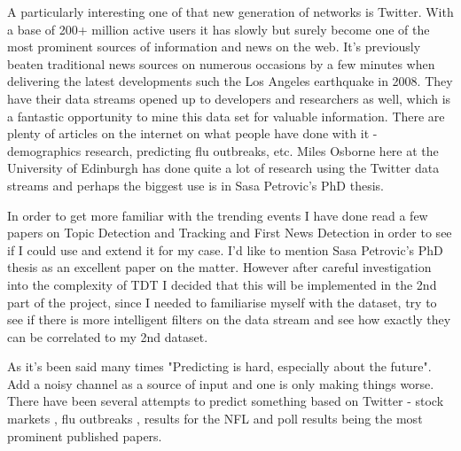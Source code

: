 \documentclass[minf,frontabs,twoside,singlespacing,parskip]{infthesis}
\begin{document}
A particularly interesting one of that new generation of networks is Twitter. With a base of 200+ million active users it has slowly but surely become one of the most prominent sources of information and news on the web. It's previously beaten traditional news sources on numerous occasions by a few minutes when delivering the latest developments such the Los Angeles earthquake in 2008. \cite{TwitterNewsWire} They have their data streams opened up to developers and researchers as well, which is a fantastic opportunity to mine this data set for valuable information. There are plenty of articles on the internet on what people have done with it - demographics research, predicting flu outbreaks, etc. \cite{TwitterResearch} Miles Osborne here at the University of Edinburgh has done quite a lot of research using the Twitter data streams  \cite{Miles} and perhaps the biggest use is in Sasa Petrovic's PhD thesis. \cite{Petrovic2012}


In order to get more familiar with the trending events I have done read a few papers on Topic Detection and Tracking and First News Detection in order to see if I could use and extend it for my case. I'd like to mention Sasa Petrovic's PhD thesis as an excellent paper on the matter. \cite{Petrovic2012} However after careful investigation into the complexity of TDT I decided that this will be implemented in the 2nd part of the project, since I needed to familiarise myself with the dataset, try to see if there is more intelligent filters on the data stream and see how exactly they can be correlated to my 2nd dataset.


As it's been said many times "Predicting is hard, especially about the future".  Add a noisy channel as a source of input and one is only making things worse. There have been several attempts to predict something based on Twitter - stock markets \cite{twitstock},  flu outbreaks \cite{twitflu}, results for the NFL \cite{twitnfl} and poll results \cite{twitpoll} being the most prominent published papers.
\end{document}

